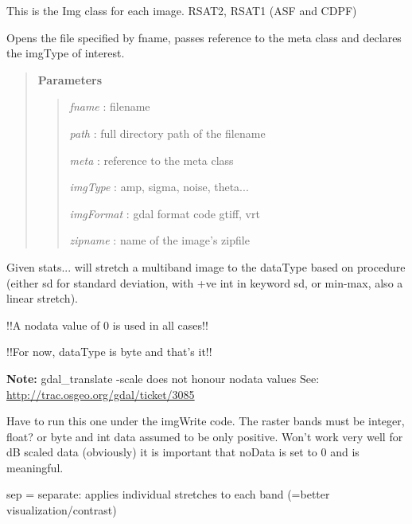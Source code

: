 \documentclass[letterpaper,10pt,english]{sphinxmanual}
\begin{document}
\begin{fulllineitems}
\label{code:Image.Image}
This is the Img class for each image.  RSAT2, RSAT1 (ASF and CDPF)

Opens the file specified by fname, passes reference to the meta class and declares the imgType of interest.
\begin{quote}

\textbf{Parameters}
\begin{quote}

\emph{fname}     : filename

\emph{path}      : full directory path of the filename

\emph{meta}      : reference to the meta class

\emph{imgType}   : amp, sigma, noise, theta...

\emph{imgFormat} : gdal format code gtiff, vrt

\emph{zipname}   : name of the image's zipfile
\end{quote}
\end{quote}

\begin{fulllineitems}
\label{code:Image.Image.applyStretch}
Given stats... will stretch a multiband image to the dataType based on
procedure (either sd for standard deviation, with +ve int in keyword sd,
or min-max, also a linear stretch).

!!A nodata value of 0 is used in all cases!!

!!For now, dataType is byte and that's it!!

\textbf{Note:} gdal\_translate -scale does not honour nodata values
See: \href{http://trac.osgeo.org/gdal/ticket/3085}{http://trac.osgeo.org/gdal/ticket/3085}

Have to run this one under the imgWrite code. The raster bands must be integer, float? or byte
and int data assumed to be only positive. Won't work very well for dB scaled data (obviously)
it is important that noData is set to 0 and is meaningful.

sep = separate: applies individual stretches to each band (=better visualization/contrast)


\end{fulllineitems}
\end{fulllineitems}
\end{document}
